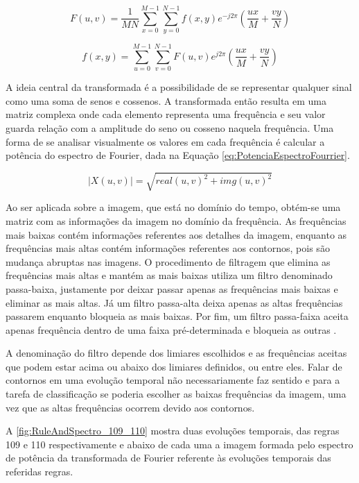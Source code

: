 \documentclass[12pt,a4paper]{report}
\begin{document}
	\begin{equation}
	F(u,v)=\frac{1}{MN}\sum_{x=0}^{M-1}\sum_{y=0}^{N-1}f(x,y)e^{-j2\pi}(\frac{ux}{M}+\frac{vy}{N})
	\label{eq:TransformadaFourrier}
	\end{equation}
	
	\begin{equation}
	f(x,y)=\sum_{u=0}^{M-1}\sum_{v=0}^{N-1}F(u,v)e^{j2\pi}(\frac{ux}{M}+\frac{vy}{N})
	\label{eq:TransformadaInversaFourrier}
	\end{equation}
	
	A ideia central da transformada é a possibilidade de se representar qualquer sinal como uma soma de senos e cossenos. A transformada então resulta em uma matriz complexa onde cada elemento representa uma frequência e seu valor guarda relação com a amplitude do seno ou cosseno naquela frequência. Uma forma de se analisar visualmente os valores em cada frequência é calcular a potência do  espectro de Fourier, dada na Equação \ref{eq:PotenciaEspectroFourrier}.
	
	\begin{equation}
	|X(u,v)| = \sqrt{real(u,v)^2 + img(u,v)^2}
	\label{eq:PotenciaEspectroFourrier}
	\end{equation}
	
	Ao ser aplicada sobre a imagem, que está no domínio do tempo, obtém-se uma matriz com as informações da imagem no domínio da frequência. As frequências mais baixas contém informações referentes aos detalhes da imagem, enquanto as frequências mais altas contém informações referentes aos contornos, pois são mudança abruptas nas imagens. O procedimento de filtragem que elimina as frequências mais altas e mantém as mais baixas utiliza um filtro denominado passa-baixa, justamente por deixar passar apenas as frequências mais baixas e eliminar as mais altas. Já um filtro passa-alta deixa apenas as altas frequências passarem enquanto bloqueia as mais baixas. Por fim, um filtro passa-faixa aceita apenas frequência dentro de uma faixa pré-determinada e bloqueia as outras \cite{Haykin:1998:SS:552094}.
	
	A denominação do filtro depende dos limiares escolhidos e as frequências aceitas que podem estar acima ou abaixo dos limiares definidos, ou entre eles. Falar de contornos em uma evolução temporal não necessariamente faz sentido e para a tarefa de classificação se poderia escolher as baixas frequências da imagem, uma vez que as altas frequências ocorrem devido aos contornos.  
	
	A \ref{fig:RuleAndSpectro_109_110} mostra duas evoluções temporais, das regras 109 e 110 respectivamente e abaixo de cada uma a imagem formada pelo espectro de potência da transformada de Fourier  referente às evoluções temporais das referidas regras. 
	
\end{document}
